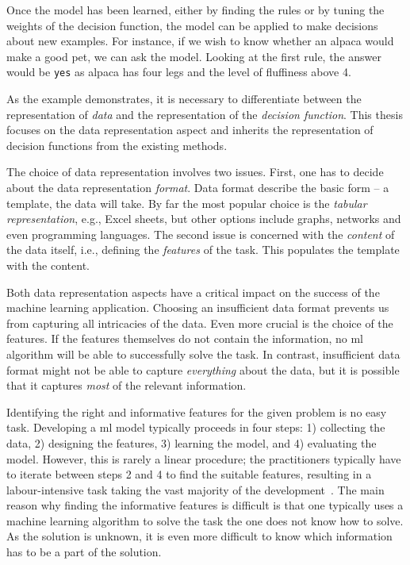 Once the model has been learned, either by finding the rules or by tuning the weights of the decision function, the model can be applied to make decisions about new examples.
For instance, if we wish to know whether an alpaca would make a good pet, we can ask the model.
Looking at the first rule, the answer would be \texttt{yes} as alpaca has four legs and the level of fluffiness above 4.



As the example demonstrates, it is necessary to differentiate between the representation of \textit{data} and the representation of  the \textit{decision function}.
This thesis focuses on the data representation aspect and inherits the representation of decision functions from the existing methods.





The choice of data representation involves two issues.
First, one has to decide about the data representation \textit{format}.
Data format describe the basic form -- a template, the data will take.
By far the most popular choice is the \textit{tabular representation}, e.g., Excel sheets, but other options include graphs, networks and even programming languages.
The second issue is concerned with the \textit{content} of the data itself, i.e., defining the \textit{features} of the task.
This populates the template with the content.



Both data representation aspects have a critical impact on the success of the machine learning application.
Choosing an insufficient data format prevents us from capturing all intricacies of the data.
Even more crucial is the choice of the features.
If the features themselves do not contain the information, no \gls{ml} algorithm will be able to successfully solve the task.
In contrast, insufficient data format might not be able to capture \textit{everything} about the data, but it is possible that it captures \textit{most} of the relevant information.



Identifying the right and informative features for the given problem is no easy task.
Developing a \gls{ml} model typically proceeds in four steps: 1) collecting the data, 2) designing the features, 3) learning the model, and 4) evaluating the model.
However, this is rarely a linear procedure; the practitioners typically have to iterate between steps 2 and 4 to find the suitable features, resulting in a labour-intensive task taking the vast majority of the development~\cite{Wirth00crisp-dm:towards}.
The main reason why finding the informative features is difficult is that one typically uses a machine learning algorithm to solve the task the one does not know how to solve.
As the solution is unknown, it is even more difficult to know which information has to be a part of the solution.


